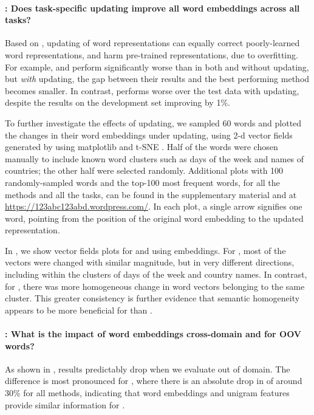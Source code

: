 \paragraph{\RQ[3]: Does task-specific updating improve all word embeddings across all tasks?}
Based on , updating of word representations can
equally correct poorly-learned word representations, and harm
pre-trained representations, due to overfitting.
For example, \CW and \Glove perform significantly worse than \Skipgram
in both \pos and \ner without updating, but \emph{with} updating, the
gap between their results and the best performing method becomes
smaller. In contrast, \Skipgram performs worse over the test data with
updating, despite the results on the development set improving by 1\%.

To further investigate the effects of updating, we sampled 60 words and
plotted the changes in their word embeddings under updating, using 2-d
vector fields generated by using matplotlib and t-SNE \cite{vanderMaaten:Hinton:2008}. Half
of the words were chosen manually to include known word clusters such as
days of the week and names of countries; the other half were selected
randomly. Additional plots with 100 randomly-sampled words and the
top-100 most frequent words, for all the methods and all the tasks, can
be found in the supplementary material and at
\url{https://123abc123abd.wordpress.com/}.  In each plot, a single arrow
signifies one word, pointing from the position of the original word embedding to the updated representation.

In , we show vector fields plots for \chunking and \ner using \Skipgram embeddings.
For \chunking, most of the vectors were changed with similar magnitude,
but in very different directions, including within the clusters of days of
the week and country names.
In contrast, for \ner, there was more homogeneous change in word vectors
belonging to the same cluster.
This greater consistency is further evidence that semantic homogeneity
appears to be more beneficial for \ner than \chunking. 




\paragraph{\RQ[4]: What is the impact of word embeddings cross-domain
  and for OOV words?}
As shown in , results predictably drop when we
evaluate out of domain.
The difference is most pronounced for \chunking, where there is an
absolute drop in \fscore of around 30\% for all methods, indicating that
word embeddings and unigram features provide similar information for
\chunking. 

